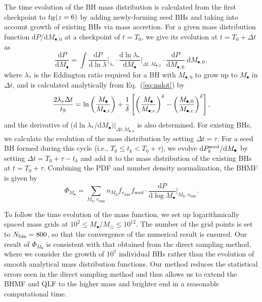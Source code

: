 \documentclass[twocolumn, twocolappendix]{aastex63}
\newcommand{\Msun}{M_\odot}
\newcommand{\Mh}{M_\mathrm{h}}
\newcommand{\Mbh}{M_\bullet}
\newcommand{\vbsm}{v_\mathrm{bsm}}
\newcommand{\tlife}{\tau}
\newcommand{\fseed}{f_\mathrm{seed}}
\newcommand{\D}{\mathrm{d}}
\begin{document}
\begin{CJK*}{UTF8}{gbsn}
The time evolution of the BH mass distribution is calculated from the first checkpoint to $t_{\rm H}(z=6)$ by adding newly-forming seed BHs
and taking into account growth of existing BHs via mass accretion.
For a given mass distribution function $\D P/\D  M_{\bullet, 0}$ at a checkpoint of $t=T_0$, 
we give its evolution at $t=T_0+\Delta t$ as
%
\begin{equation}
  \label{eq:dpdm}
  \frac{\D P}{\D \Mbh} = \int
   \frac{\D P}{\D \ln \lambda}\Big|_{\lambda_\ast} \cdot
   \frac{\D \ln \lambda_\ast}{\D  \Mbh}\Big|_{\Delta t, M_{\bullet,0}} \cdot
  \frac{\D P}{\D M_{\bullet, 0}}~\D M_{\bullet, 0},
\end{equation}
%
where $\lambda_\ast$ is the Eddington ratio required for a BH with $M_{\bullet,0}$ to grow up to $\Mbh$ in $\Delta t$,
and is calculated analytically from Eq.~(\ref{eq:mdot}) by
%
\begin{equation}
  \label{eq:mi2m}
\frac{2 \lambda_\ast \Delta t}{t_{\rm S}}=
  \ln \left(\frac{\Mbh} {M_{\bullet,i}}\right) + \frac{1}{\delta} 
  \left[ \left(\frac{\Mbh}{M_{\bullet,c}}\right)^\delta - \left(\frac{M_{\bullet, 0}}{M_{\bullet,c}}\right)^\delta \right],
\end{equation}
%
and the derivative of ($\D \ln \lambda_\ast / \D  \Mbh )|_{\Delta t, M_{\bullet,0}}$ is also determined.
For existing BHs, we calculate the evolution of the mass distribution by setting $\Delta t = \tlife$.
For a seed BH formed during this cycle (i.e., $T_0\leq t_k < T_0+\tlife$), 
we evolve $\D P^{\rm seed}_k/\D \Mbh$ by setting $\Delta t = T_0+\tlife -t_k$ and add it to the mass distribution 
of the existing BHs at $t=T_0+\tlife$.
Combining the PDF and number density normalization, the BHMF is given by
%
\begin{equation}
  \Phi_{\Mbh} 
  =\sum_{\Mh, \vbsm} n_{\Mh} f_{\vbsm} {\fseed} \cdot \frac{\D P}{\D \log \Mbh}\Big|_{\Mh, \vbsm}.
 \end{equation}


To follow the time evolution of the mass function, we set up 
logarithmically spaced mass grids at $10^2 \leq \Mbh /\Msun \leq 10^{12}$.
The number of the grid points is set to $N_{\rm bin}=800$, so that the convergence of the numerical result is ensured.
Our result of $\Phi_{\Mbh}$ is consistent with that obtained from the direct sampling method, where 
we consider the growth of $10^7$ individual BHs rather than the evolution of smooth analytical mass distribution functions.
Our method reduces the statistical errors seen in the direct sampling method 
and thus allows us to extend the BHMF and QLF to the higher mass and brighter end
in a reasonable computational time.




\end{CJK*}
\end{document}

